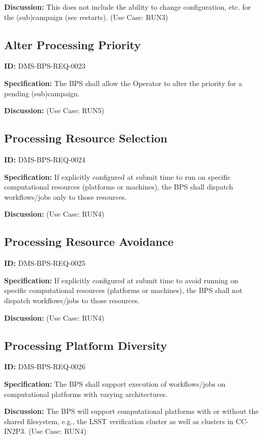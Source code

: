 \documentclass[SE,toc]{lsstdoc}
\begin{document}
\textbf{Discussion:}
This does not include the ability to change configuration, etc. for the (sub)campaign (see restarts).  (Use Case: RUN3)

\subsection{Alter Processing Priority}

\label{DMS-BPS-REQ-0023}
\textbf{ID:} DMS-BPS-REQ-0023

\textbf{Specification:}
The BPS shall allow the Operator to alter the priority for a pending (sub)campaign.

\textbf{Discussion:}
(Use Case: RUN5)

\subsection{Processing Resource Selection}

\label{DMS-BPS-REQ-0024}
\textbf{ID:} DMS-BPS-REQ-0024

\textbf{Specification:}
If explicitly configured at submit time to run on specific computational resources (platforms or machines), the BPS shall dispatch workflows/jobs only to those resources.

\textbf{Discussion:}
(Use Case: RUN4)

\subsection{Processing Resource Avoidance}

\label{DMS-BPS-REQ-0025}
\textbf{ID:} DMS-BPS-REQ-0025

\textbf{Specification:}
If explicitly configured at submit time to avoid running on specific computational resources (platforms or machines), the BPS shall not dispatch workflows/jobs to those resources.

\textbf{Discussion:}
(Use Case: RUN4)

\subsection{Processing Platform Diversity}

\label{DMS-BPS-REQ-0026}
\textbf{ID:} DMS-BPS-REQ-0026

\textbf{Specification:}
The BPS shall support execution of workflows/jobs on computational platforms with varying architectures.

\textbf{Discussion:}
The BPS will support computational platforms with or without the shared filesystem, e.g., the LSST verification cluster as well as clusters in CC-IN2P3.  (Use Case: RUN4)
\end{document}
